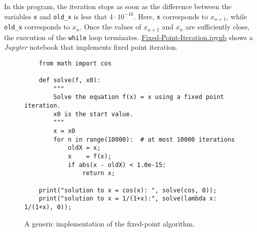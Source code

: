 In this program, the iteration stops as soon as the difference between the variables \texttt{x} and 
\texttt{old\_x} is less that $4 \cdot 10^{-16}$.  Here, \texttt{x} corresponds to $x_{n+1}$, while \texttt{old\_x}
corresponds to $x_n$.  Once the values of $x_{n+1}$ and $x_n$ are sufficiently close, the execution of the \texttt{while} loop
terminates.
\href{https://github.com/karlstroetmann/Logic/blob/master/Python/Fixed-Point-Iteration.ipynb}{Fixed-Point-Iteration.ipynb}
shows a \textsl{Jupyter} notebook that implements fixed point iteration.


\begin{figure}[!ht]
\centering
\begin{verbatim}
    from math import cos
    
    def solve(f, x0):
        """
        Solve the equation f(x) = x using a fixed point iteration.
        x0 is the start value.
        """
        x = x0
        for n in range(10000):  # at most 10000 iterations
            oldX = x;
            x    = f(x);
            if abs(x - oldX) < 1.0e-15: 
                return x;
    
    print("solution to x = cos(x): ", solve(cos, 0));
    print("solution to x = 1/(1+x):", solve(lambda x: 1/(1+x), 0));
\end{verbatim}
\vspace*{-0.3cm}
\caption{A generic implementation of the fixed-point algorithm.}
\label{fig:fixed-point.py}
\end{figure}

